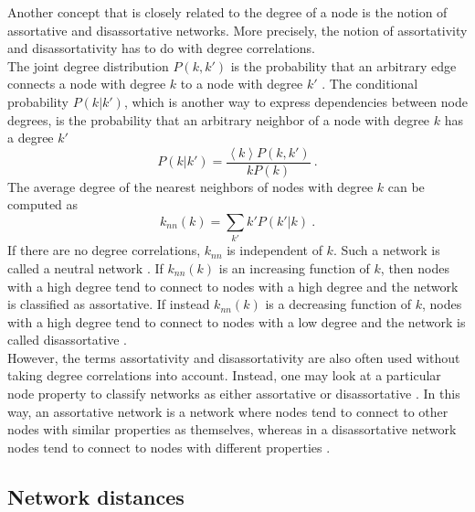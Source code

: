 \documentclass[11 pt , letterpaper , twoside , openright]{book}
\begin{document}
Another concept that is closely related to the degree of a node is the notion of assortative and disassortative networks. More precisely, the notion of assortativity and disassortativity has to do with degree correlations. \\
The joint degree distribution $P(k, k')$ is the probability that an arbitrary edge connects a node with degree $k$ to a node with degree $k'$ \cite{F.Costa2007}. The conditional probability $P(k|k')$, which is another way to express dependencies between node degrees, is the probability that an arbitrary neighbor of a node with degree $k$ has a degree $k'$ \cite{F.Costa2007}
\begin{equation}
	P(k|k') = \frac{\left<k\right>P(k, k')}{kP(k)} \ .
\end{equation}
The average degree of the nearest neighbors of nodes with degree $k$ can be computed as \cite{F.Costa2007}
\begin{equation}
	k_{nn}(k) = \sum_{k'} k'P(k'|k) \ .
\end{equation}
If there are no degree correlations, $k_{nn}$ is independent of $k$. Such a network is called a neutral network \cite{F.Costa2007}. If $k_{nn}(k)$ is an increasing function of $k$, then nodes with a high degree tend to connect to nodes with a high degree and the network is classified as assortative. If instead $k_{nn}(k)$ is a decreasing function of $k$, nodes with a high degree tend to connect to nodes with a low degree and the network is called disassortative \cite{F.Costa2007}.\\
However, the terms assortativity and disassortativity are also often used without taking degree correlations into account. Instead, one may look at a particular node property to classify networks as either assortative or disassortative \cite{Thed2014}. In this way, an assortative network is a network where nodes tend to connect to other nodes with similar properties as themselves, whereas in a disassortative network nodes tend to connect to nodes with different properties \cite{Thed2014}.

\newpage
\subsection{Network distances}
\end{document}
